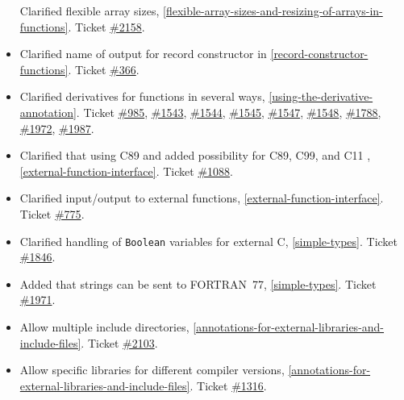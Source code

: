 \begin{itemize}
  Clarified flexible array sizes, \cref{flexible-array-sizes-and-resizing-of-arrays-in-functions}. Ticket
  \href{https://github.com/modelica/ModelicaSpecification/issues/2158}{\#2158}.
\item
  Clarified name of output for record constructor in \cref{record-constructor-functions}.
  Ticket \href{https://github.com/modelica/ModelicaSpecification/issues/366}{\#366}.
\item
  Clarified derivatives for functions in several ways, \cref{using-the-derivative-annotation}.
  Ticket \href{https://github.com/modelica/ModelicaSpecification/issues/985}{\#985},
  \href{https://github.com/modelica/ModelicaSpecification/issues/1543}{\#1543},
  \href{https://github.com/modelica/ModelicaSpecification/issues/1544}{\#1544},
  \href{https://github.com/modelica/ModelicaSpecification/issues/1545}{\#1545},
  \href{https://github.com/modelica/ModelicaSpecification/issues/1547}{\#1547},
  \href{https://github.com/modelica/ModelicaSpecification/issues/1548}{\#1548},
  \href{https://github.com/modelica/ModelicaSpecification/issues/1788}{\#1788},
  \href{https://github.com/modelica/ModelicaSpecification/issues/1972}{\#1972},
  \href{https://github.com/modelica/ModelicaSpecification/issues/1987}{\#1987}.
\item
  Clarified that using C89 and added possibility for C89, C99, and C11 ,
  \cref{external-function-interface}. Ticket
  \href{https://github.com/modelica/ModelicaSpecification/issues/1088}{\#1088}.
\item
  Clarified input/output to external functions, \cref{external-function-interface}. Ticket
  \href{https://github.com/modelica/ModelicaSpecification/issues/775}{\#775}.
\item
  Clarified handling of \lstinline!Boolean! variables for external C, \cref{simple-types}.
  Ticket \href{https://github.com/modelica/ModelicaSpecification/issues/1846}{\#1846}.
\item
  Added that strings can be sent to FORTRAN~77, \cref{simple-types}. Ticket
  \href{https://github.com/modelica/ModelicaSpecification/issues/1971}{\#1971}.
\item
  Allow multiple include directories, \cref{annotations-for-external-libraries-and-include-files}. Ticket
  \href{https://github.com/modelica/ModelicaSpecification/issues/2103}{\#2103}.
\item
  Allow specific libraries for different compiler versions,
  \cref{annotations-for-external-libraries-and-include-files}. Ticket
  \href{https://github.com/modelica/ModelicaSpecification/issues/1316}{\#1316}.

\end{itemize}
